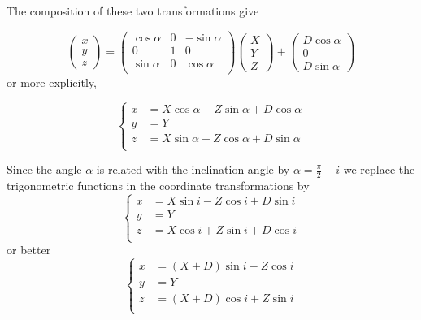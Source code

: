 The composition of these two transformations give

\begin{equation}
\begin{pmatrix}
x \\
y \\
z
\end{pmatrix} =
\begin{pmatrix}
\cos \alpha & 0 &-\sin\alpha \\
0 & 1 &0\\
\sin \alpha &  0 & \cos \alpha\\
\end{pmatrix} 
\begin{pmatrix}
X\\
Y\\
Z
\end{pmatrix} +
\begin{pmatrix}
D \cos \alpha \\
0 \\
D \sin \alpha
\end{pmatrix}
\end{equation}
or more explicitly,

\begin{equation}
\begin{cases}
x &= X\cos \alpha - Z \sin\alpha + D \cos \alpha\\
y &= Y\\
z &= X \sin \alpha + Z \cos \alpha + D \sin \alpha\\
\end{cases}
\end{equation}

Since the angle $\alpha$ is related with the inclination angle by $\alpha = \frac{\pi}{2} - i$ we replace the trigonometric functions in the coordinate transformations by
\begin{equation}
\begin{cases}
x &= X\sin i - Z \cos i + D \sin i\\
y &= Y\\
z &= X \cos i + Z \sin i + D \cos i\\
\end{cases}
\end{equation}
or better
\begin{equation}
\begin{cases}
x &= (X+D)\sin i - Z \cos i \\
y &= Y\\
z &= (X+D) \cos i + Z \sin i \\
\end{cases}
\end{equation}

